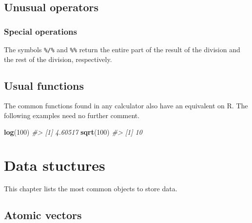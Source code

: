 \documentclass[]{book}
\newenvironment{Shaded}{}{}
\newcommand{\CommentTok}[1]{\textcolor[rgb]{0.38,0.63,0.69}{\textit{#1}}}
\newcommand{\DecValTok}[1]{\textcolor[rgb]{0.25,0.63,0.44}{#1}}
\newcommand{\KeywordTok}[1]{\textcolor[rgb]{0.00,0.44,0.13}{\textbf{#1}}}
\newcommand{\NormalTok}[1]{#1}
\newcommand{\OperatorTok}[1]{\textcolor[rgb]{0.40,0.40,0.40}{#1}}
\theoremstyle{definition}
\theoremstyle{definition}
\theoremstyle{definition}
\theoremstyle{remark}
\begin{document}
\hypertarget{unusual-operators-1}{%
\section{Unusual operators}\label{unusual-operators-1}}

\hypertarget{special-operations-1}{%
\subsection{Special operations}\label{special-operations-1}}

The symbols \texttt{\%/\%} and \texttt{\%\%} return the entire part of
the result of the division and the rest of the division, respectively.

\begin{Shaded}
\end{Shaded}

\hypertarget{usual-functions-1}{%
\section{Usual functions}\label{usual-functions-1}}

The common functions found in any calculator also have an equivalent on
R. The following examples need no further comment.

\begin{Shaded}
\begin{Highlighting}[]
\KeywordTok{log}\NormalTok{(}\DecValTok{100}\NormalTok{)}
\CommentTok{#> [1] 4.60517}
\KeywordTok{sqrt}\NormalTok{(}\DecValTok{100}\NormalTok{)}
\CommentTok{#> [1] 10}
\end{Highlighting}
\end{Shaded}

\hypertarget{datastructures}{%
\chapter{Data stuctures}\label{datastructures}}

This chapter lists the most common objects to store data.

\hypertarget{atomic-vectors}{%
\section{Atomic vectors}\label{atomic-vectors}}
\end{document}
